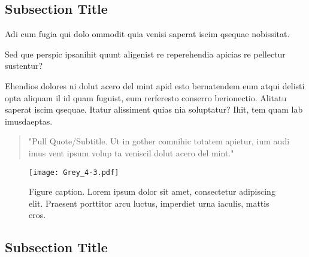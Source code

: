 \documentclass[
]{ImperialPoster}
\begin{document}

\titlesection %

\begin{multicols}{3} %
	
	
	\subsection{Subsection Title}
	
	Adi cum fugia qui dolo ommodit quia venisi saperat iscim qsequae nobissitat.
	
	Sed que perspic ipsanihit quunt aligenist re reperehendia \textcolor{ICLBlue}{apicias re pellectur sustentur?}
	
	Ehendios \textcolor{ICLBlue}{dolores} ni dolut acero del mint apid esto bernatendem eum \textcolor{ICLBlue}{atqui delisti opta} aliquam il id quam fuguist, eum rerferesto conserro berionectio. Alitatu saperat iscim qsequae. Itatur alissiment quias nia soluptatur? Ihit, tem quam lab imusdaeptas.
	
	\begin{quote}
		"Pull Quote/Subtitle. Ut in gother comnihic totatem apietur, ium audi imus vent ipsum volup ta veniscil dolut acero del mint."
	\end{quote}
	
	\vspace{20pt} %
	
	\begin{figure}[H] %
		\texttt{[image: Grey\_4-3.pdf]} %
		\caption{Figure caption. Lorem ipsum dolor sit amet, consectetur adipiscing elit. Praesent porttitor arcu luctus, imperdiet urna iaculis, mattis eros.}
	\end{figure}
	
	\subsection{Subsection Title}
	

\end{multicols}
\end{document}
